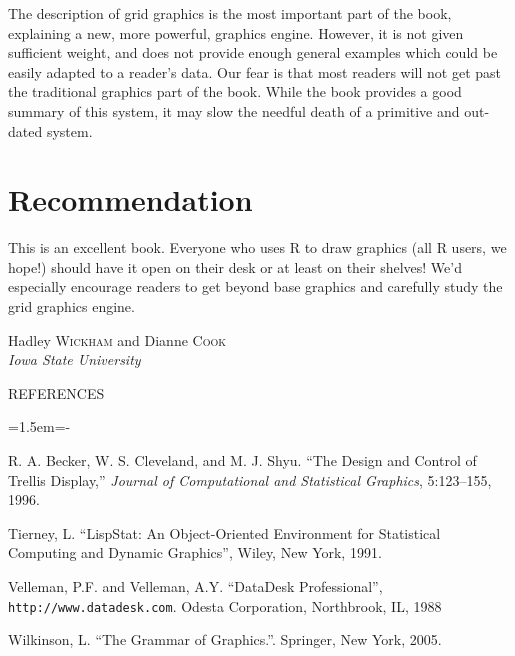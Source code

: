 \documentclass[12pt]{article}
\newenvironment{references}{
  \begin{center} \textsf{REFERENCES} \end{center}
  \begin{list}{}{\topsep=0pt\parsep=0pt\baselineskip=20pt
   \leftmargin=1.5em\itemindent=-\leftmargin}}
  {\end{list}}
\begin{document}
The description of grid graphics is the most important part of the
book, explaining a new, more powerful, graphics engine. However, it is
not given sufficient weight, and does not provide enough general
examples which could be easily adapted to a reader's data. Our fear is
that most readers will not get past the traditional graphics part of
the book.  While the book provides a good summary of this system, it
may slow the needful death of a primitive and out-dated system.

\section{Recommendation}

This is an excellent book. Everyone who uses R to draw graphics (all R
users, we hope!) should have it open on their desk or at least on
their shelves! We'd especially encourage readers to get beyond base
graphics and carefully study the grid graphics engine.

\begin{flushright}\def\baselinestretch{1}
Hadley \textsc{Wickham} and Dianne \textsc{Cook} \\ 
\emph{Iowa State University}
\end{flushright}

\begin{references} 
\item R. A. Becker, W. S. Cleveland, and M. J. Shyu. ``The Design and Control of Trellis Display,'' \emph{Journal of Computational and Statistical Graphics}, 5:123–155, 1996.

\item Tierney, L. ``LispStat: An Object-Oriented Environment for Statistical Computing and Dynamic Graphics'', Wiley, New York, 1991.

\item Velleman, P.F. and Velleman, A.Y. ``DataDesk Professional'', {\tt http://www.datadesk.com}. Odesta Corporation, Northbrook, IL, 1988

\item Wilkinson, L.  ``The Grammar of Graphics.''. Springer, New York, 2005.

\end{references}
\end{document}
